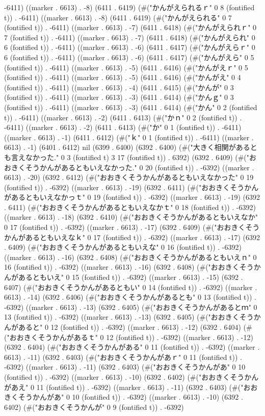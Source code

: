 -6411) ((marker . 6613) . -8) (6411 . 6419) (#("かんがえられるｒ" 0 8 (fontified t)) . -6411) ((marker . 6613) . -8) (6411 . 6419) (#("かんがえられる" 0 7 (fontified t)) . -6411) ((marker . 6613) . -7) (6411 . 6418) (#("かんがえられｒ" 0 7 (fontified t)) . -6411) ((marker . 6613) . -7) (6411 . 6418) (#("かんがえられ" 0 6 (fontified t)) . -6411) ((marker . 6613) . -6) (6411 . 6417) (#("かんがえらｒ" 0 6 (fontified t)) . -6411) ((marker . 6613) . -6) (6411 . 6417) (#("かんがえら" 0 5 (fontified t)) . -6411) ((marker . 6613) . -5) (6411 . 6416) (#("かんがえｒ" 0 5 (fontified t)) . -6411) ((marker . 6613) . -5) (6411 . 6416) (#("かんがえ" 0 4 (fontified t)) . -6411) ((marker . 6613) . -4) (6411 . 6415) (#("かんが" 0 3 (fontified t)) . -6411) ((marker . 6613) . -3) (6411 . 6414) (#("かんｇ" 0 3 (fontified t)) . -6411) ((marker . 6613) . -3) (6411 . 6414) (#("かん" 0 2 (fontified t)) . -6411) ((marker . 6613) . -2) (6411 . 6413) (#("かｎ" 0 2 (fontified t)) . -6411) ((marker . 6613) . -2) (6411 . 6413) (#("か" 0 1 (fontified t)) . -6411) ((marker . 6613) . -1) (6411 . 6412) (#("ｋ" 0 1 (fontified t)) . -6411) ((marker . 6613) . -1) (6401 . 6412) nil (6399 . 6400) (6392 . 6400) (#("大きく相関があるとも言えなかった." 0 3 (fontified t) 3 17 (fontified t)) . 6392) (6392 . 6409) (#("おおきくそうかんがあるともいえなかった." 0 20 (fontified t)) . -6392) ((marker . 6613) . -20) (6392 . 6412) (#("おおきくそうかんがあるともいえなかった" 0 19 (fontified t)) . -6392) ((marker . 6613) . -19) (6392 . 6411) (#("おおきくそうかんがあるともいえなかっｔ" 0 19 (fontified t)) . -6392) ((marker . 6613) . -19) (6392 . 6411) (#("おおきくそうかんがあるともいえなかｔ" 0 18 (fontified t)) . -6392) ((marker . 6613) . -18) (6392 . 6410) (#("おおきくそうかんがあるともいえなか" 0 17 (fontified t)) . -6392) ((marker . 6613) . -17) (6392 . 6409) (#("おおきくそうかんがあるともいえなｋ" 0 17 (fontified t)) . -6392) ((marker . 6613) . -17) (6392 . 6409) (#("おおきくそうかんがあるともいえな" 0 16 (fontified t)) . -6392) ((marker . 6613) . -16) (6392 . 6408) (#("おおきくそうかんがあるともいえｎ" 0 16 (fontified t)) . -6392) ((marker . 6613) . -16) (6392 . 6408) (#("おおきくそうかんがあるともいえ" 0 15 (fontified t)) . -6392) ((marker . 6613) . -15) (6392 . 6407) (#("おおきくそうかんがあるともい" 0 14 (fontified t)) . -6392) ((marker . 6613) . -14) (6392 . 6406) (#("おおきくそうかんがあるとも" 0 13 (fontified t)) . -6392) ((marker . 6613) . -13) (6392 . 6405) (#("おおきくそうかんがあるとｍ" 0 13 (fontified t)) . -6392) ((marker . 6613) . -13) (6392 . 6405) (#("おおきくそうかんがあると" 0 12 (fontified t)) . -6392) ((marker . 6613) . -12) (6392 . 6404) (#("おおきくそうかんがあるｔ" 0 12 (fontified t)) . -6392) ((marker . 6613) . -12) (6392 . 6404) (#("おおきくそうかんがある" 0 11 (fontified t)) . -6392) ((marker . 6613) . -11) (6392 . 6403) (#("おおきくそうかんがあｒ" 0 11 (fontified t)) . -6392) ((marker . 6613) . -11) (6392 . 6403) (#("おおきくそうかんがあ" 0 10 (fontified t)) . -6392) ((marker . 6613) . -10) (6392 . 6402) (#("おおきくそうかんがあえ" 0 11 (fontified t)) . -6392) ((marker . 6613) . -11) (6392 . 6403) (#("おおきくそうかんがあ" 0 10 (fontified t)) . -6392) ((marker . 6613) . -10) (6392 . 6402) (#("おおきくそうかんが" 0 9 (fontified t)) . -6392) 